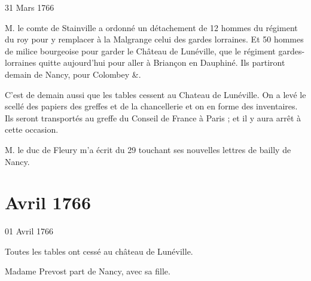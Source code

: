                      
                     \begin{diary}{31 Mars 1766}{}
                        
                        
                           M. le comte de Stainville a
                           ordonné un
                           détachement de 12 hommes du régiment du roy pour
                           y remplacer à la
                              Malgrange
                           celui des gardes lorraines.
                           Et 50 hommes de milice bourgeoise
                           pour garder
                           le Château de
                              Lunéville, que le régiment gardes-
                              lorraines quitte aujourd'hui pour aller à
                           Briançon en Dauphiné. Ils
                           partiront demain
                           de Nancy, pour Colombey &. \bigskip
        
        
                        
                         C'est de demain aussi que les tables cessent
                           au Chateau de
                              Lunéville. On a levé le scellé
                           des papiers des greffes et de la
                              chancellerie
                           et on en forme des inventaires. Ils seront
                           transportés au greffe du Conseil de France
                           à Paris ; et il y aura arrêt à
                           cette
                           occasion. \bigskip
        
        
                        
                           M. le duc de Fleury m'a écrit du
                              29
                           touchant ses nouvelles lettres de bailly
                           de Nancy. \bigskip
        
        
                     \end{diary}
                  \chapter*{Avril 1766}
                     
                     
                     \begin{diary}{01 Avril 1766}{}
                        
                         Toutes les tables ont cessé au château de
                              Lunéville. \bigskip
        
        
                        
                           Madame Prevost part de Nancy, avec sa
                              fille. \bigskip
        
        
                     \end{diary}


